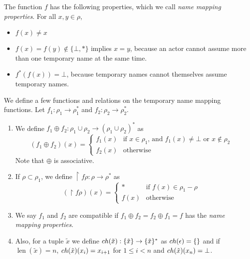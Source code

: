 The function $f$ has the following properties,
which we call \emph{name mapping properties}. For all $x, y \in \rho$,
\begin{itemize}[nosep]
  \item $f(x) \neq x$
  \item $f(x) = f(y) \notin \{\bot, *\}$ implies $x = y$,
    because an actor cannot assume
    more than one temporary name at the same time.
  \item $f^*(f(x)) = \bot$,
    because temporary names cannot themselves assume temporary names.
\end{itemize}

We define a few functions and relations
on the temporary name mapping functions.
Let $f_1: \rho_1 \to \rho_1^*$ and  $f_2: \rho_2 \to \rho_2^*$.

\begin{enumerate}
  \item
    We define $f_1 \oplus f_2: \rho_1 \cup \rho_2 \to (\rho_1 \cup \rho_2)^*$ as
    \begin{equation*}
      (f_1 \oplus f_2)(x) =
      \begin{cases}
        f_1(x) &\text{if $x \in \rho_1$, and $f_1(x) \neq \bot$ or $x \notin \rho_2$}\\
        f_2(x) &\text{otherwise}
      \end{cases}
    \end{equation*}
    Note that $\oplus$ is associative.
  \item
    If $\rho\subset\rho_1$, we define $\restriction{f}{\rho}: \rho\to\rho^*$ as
    \begin{equation*}
      (\restriction{f}{\rho})(x) =
      \begin{cases}
        *    &\text{if $f(x) \in \rho_1 - \rho$}\\
        f(x) &\text{otherwise}
      \end{cases}
    \end{equation*}
  \item
    We say $f_1$ and $f_2$ are compatible if
    $f_1 \oplus f_2 = f_2 \oplus f_1 = f$
    has the \emph{name mapping properties}.
  \item
    Also, for a tuple $\tilde{x}$ we define
    $ch(\tilde{x}): \{\tilde{x}\} \to \{\tilde{x}\}^*$
    as
    $ch(\epsilon) = \{\}$
    and if $\operatorname{len}(\tilde{x}) = n$,
    $ch(\tilde{x})(x_i) = x_{i+1}$ for $1 \leq i < n$
    and
    $ch(\tilde{x})(x_n) = \bot$.
\end{enumerate}

